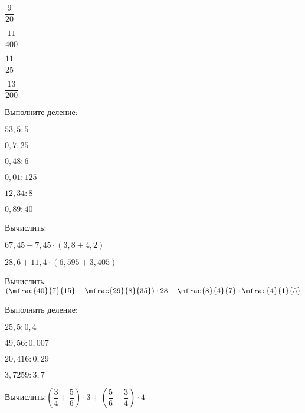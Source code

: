 \begin{class}[number=5]
\begin{listofex}[resume]
\begin{enumcols}[itemcolumns=6]
			\item \( \dfrac{9}{20} \)
			\item \( \dfrac{11}{400} \)
			\item \( \dfrac{11}{25} \)
			\item \( \dfrac{13}{200} \)
		\end{enumcols}
		\item Выполните деление:
		\begin{enumcols}[itemcolumns=6]
			\item \( 53,5:5 \)
			\item \( 0,7:25 \)
			\item \( 0,48:6 \)
			\item \( 0,01:125 \)
			\item \( 12,34:8 \)
			\item \( 0,89:40 \)
		\end{enumcols}
	\end{listofex}
\end{class}
%
%
\begin{class}[number=6]
	\begin{listofex}
		\item Вычислить:
		\begin{enumcols}[itemcolumns=2]
			\item \( 67,45-7,45\cdot(3,8+4,2) \)
			\item \( 28,6+11,4\cdot(6,595+3,405) \)
		\end{enumcols}
		\item Вычислить:\quad\( \left( \mfrac{40}{7}{15}-\mfrac{29}{8}{35} \right)\cdot28-\mfrac{8}{4}{7}\cdot\mfrac{4}{1}{5} \)
		\item Выполнить деление:
		\begin{enumcols}[itemcolumns=4]
			\item \( 25,5:0,4 \)
			\item \( 49,56:0,007 \)
			\item \( 20,416:0,29 \)
			\item \( 3,7259:3,7 \)
		\end{enumcols}
	\end{listofex}
\end{class}
%
%
\begin{homework}[number=3]
	\begin{listofex}
		\item Вычислить:\quad\( \left( \dfrac{3}{4}+\dfrac{5}{6} \right)\cdot3+\left( \dfrac{5}{6}-\dfrac{3}{4} \right)\cdot4 \)
	\end{listofex}
\end{homework}
%	
%	
%	
